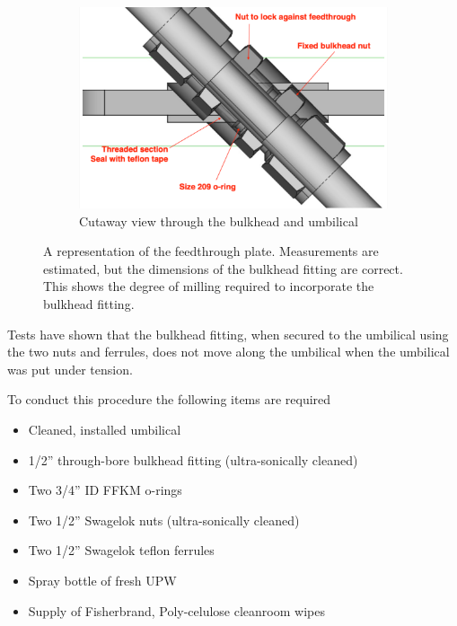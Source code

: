 \documentclass[11pt]{article}
\begin{document}
\begin{figure}
\begin{center}
\begin{subfigure}{0.6\textwidth}
      \includegraphics[width=\textwidth]{UmbilicalFeedthroughCutaway_2a.pdf}
      \caption{Cutaway view through the bulkhead and umbilical}
      \label{fig:UFCut}
    \end{subfigure}
  \end{center}
  \caption{A representation of the feedthrough plate. Measurements are estimated, but the dimensions of the bulkhead fitting are correct. This shows the degree of milling required to incorporate the bulkhead fitting.}
  \label{fig:UmbilicalFeedthrough}
\end{figure}

Tests have shown that the bulkhead fitting, when secured to the
umbilical using the two nuts and ferrules, does not move along the
umbilical when the umbilical was put under tension. 

To conduct this procedure the following items are required
\begin{itemize}[label=$\square$]
\item Cleaned, installed umbilical
\item 1/2'' through-bore bulkhead fitting (ultra-sonically cleaned)
\item Two 3/4'' ID FFKM o-rings
\item Two 1/2'' Swagelok nuts (ultra-sonically cleaned)
\item Two 1/2'' Swagelok teflon ferrules
\item Spray bottle of fresh UPW
\item Supply of Fisherbrand, Poly-celulose cleanroom wipes
\end{itemize}
\end{document}
